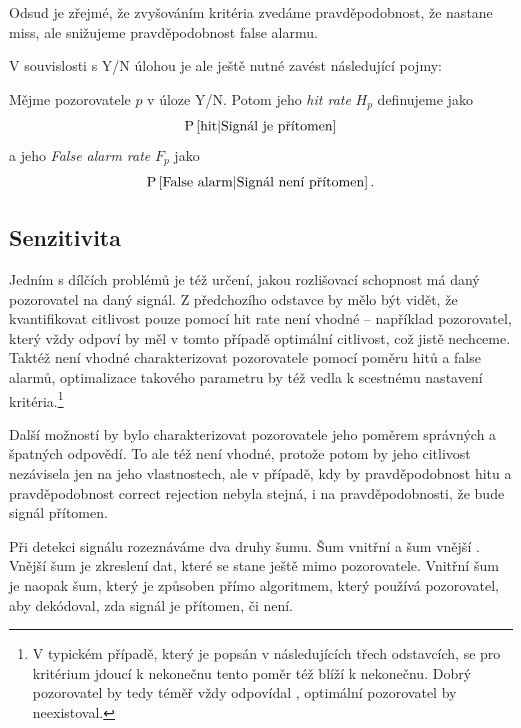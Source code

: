 Odsud je zřejmé, že zvyšováním kritéria zvedáme pravděpodobnost, že nastane
miss, ale snižujeme pravděpodobnost false alarmu.

V souvislosti s Y/N úlohou je ale ještě nutné zavést následující pojmy:

\begin{definice}\label{hitrate}
Mějme pozorovatele $p$ v úloze Y/N. Potom jeho \emph{hit rate\/} $H_p$ definujeme jako $$\P{\text{hit}|\text{Signál je přítomen}}$$ a jeho \emph{False alarm rate\/} $F_p$ jako $$\P{\text{False alarm}|\text{Signál není přítomen}}.$$
\end{definice}

\subsection{Senzitivita}

Jedním s dílčích problémů je též určení, jakou rozlišovací schopnost má daný
pozorovatel na daný signál. Z předchozího odstavce by mělo být vidět, že
kvantifikovat citlivost pouze pomocí hit rate není vhodné -- například pozorovatel, který vždy odpoví
 by měl v tomto případě optimální citlivost, což jistě nechceme. Taktéž
není vhodné charakterizovat pozorovatele pomocí poměru hitů a false alarmů,
optimalizace takového parametru by též vedla k scestnému nastavení
kritéria.\footnote{V typickém případě, který je popsán v následujících třech
odstavcích, se pro kritérium jdoucí k nekonečnu tento poměr též blíží k
nekonečnu. Dobrý pozorovatel by tedy téměř vždy odpovídal , optimální
pozorovatel by neexistoval.}

Další možností by bylo charakterizovat pozorovatele jeho poměrem správných
a špatných odpovědí. To ale též není vhodné, protože potom by jeho citlivost
nezávisela jen na jeho vlastnostech, ale v případě, kdy by pravděpodobnost hitu
a pravděpodobnost correct rejection nebyla stejná, i na pravděpodobnosti, že bude signál přítomen.

Při detekci signálu rozeznáváme dva druhy šumu. Šum vnitřní a šum vnější \citep{DavidSDT}.
Vnější šum je zkreslení dat, které se stane ještě mimo pozorovatele. Vnitřní
šum je naopak šum, který je způsoben přímo algoritmem, který používá
pozorovatel, aby dekódoval, zda signál je přítomen, či není.

